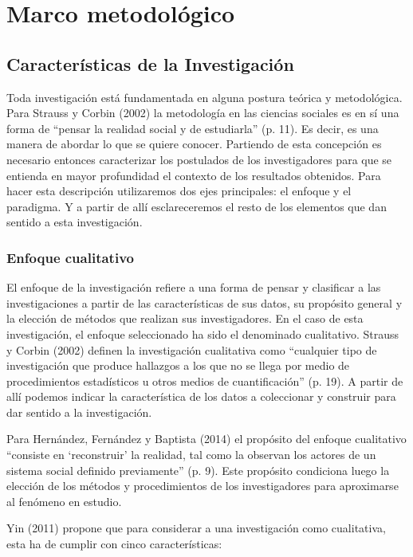 \chapter{Marco metodológico}


\section{Características de la Investigación}
Toda investigación está fundamentada en alguna postura teórica y metodológica.
Para Strauss y Corbin (2002) la metodología en las ciencias sociales es en sí
una forma de “pensar la realidad social y de estudiarla” (p. 11).
Es decir, es una manera de abordar lo que se quiere conocer.
Partiendo de esta concepción es necesario entonces caracterizar los postulados
de los investigadores para que se entienda en mayor profundidad el contexto de
los resultados obtenidos.
Para hacer esta descripción utilizaremos dos ejes principales: el enfoque y el
paradigma.
Y a partir de allí esclareceremos el resto de los elementos que dan sentido a
esta investigación.

\subsection{Enfoque cualitativo}
El enfoque de la investigación refiere a una forma de pensar y clasificar a las
investigaciones a partir de las características de sus datos, su propósito
general y la elección de métodos que realizan sus investigadores.
En el caso de esta investigación, el enfoque seleccionado ha sido el denominado
cualitativo.
Strauss y Corbin (2002) definen la investigación cualitativa como “cualquier
tipo de investigación que produce hallazgos a los que no se llega por medio de
procedimientos estadísticos u otros medios de cuantificación” (p. 19).
A partir de allí podemos indicar la característica de los datos a coleccionar y
construir para dar sentido a la investigación.

Para Hernández, Fernández y Baptista (2014) el propósito del enfoque cualitativo
“consiste en ‘reconstruir’ la realidad, tal como la observan los actores de un
sistema social definido previamente” (p. 9).
Este propósito condiciona luego la elección de los métodos y procedimientos de
los investigadores para aproximarse al fenómeno en estudio.

Yin (2011) propone que para considerar a una investigación como cualitativa,
esta ha de cumplir con cinco características:

